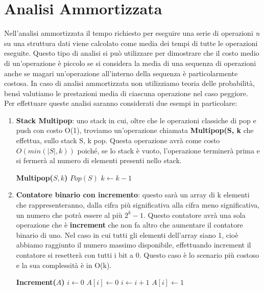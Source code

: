 \chapter{Analisi Ammortizzata}
Nell'analisi ammortizzata il tempo richiesto per eseguire una serie di operazioni \textit{n} su una struttura dati viene calcolato come media dei tempi di tutte le operazioni eseguite. Questo tipo di analisi si può utilizzare per dimostrare che il costo medio di un'operazione è piccolo se si considera la media di una sequenza di operazioni anche se magari un'operazione all'interno della sequenza è particolarmente costosa. In caso di analisi ammortizzata non utilizziamo teoria delle probabilità, bensì valutiamo le prestazioni media di ciascuna operazione nel caso peggiore.\\
Per effettuare queste analisi saranno considerati due esempi in particolare:
\begin{enumerate}
    \item \textbf{Stack Multipop}: uno stack in cui, oltre che le operazioni classiche di pop e push con costo O(1), troviamo un'operazione chiamata \textbf{Multipop(S, k} che effettua, sullo stack S, k pop. Questa operazione avrà come costo $O(min(|S|,k))$ poiché, se lo stack è vuoto, l'operazione terminerà prima e si fermerà al numero di elementi presenti nello stack.
    \begin{algorithmic}[1]
        \Statex \textbf{Multipop($S, k$)}
            \State $Pop(S)$
            \State $k \gets k - 1$
        \EndWhile
    \end{algorithmic}
    \item \textbf{Contatore binario con incremento}: questo sarà un array di k elementi che rappresenteranno, dalla cifra più significativa alla cifra meno significativa, un numero che potrà essere al più $2^k-1$. Questo contatore avrà una sola operazione che è \textbf{increment} che non fa altro che aumentare il contatore binario di uno. Nel caso in cui tutti gli elementi dell'array siano 1, cioè abbiamo raggiunto il numero massimo disponibile, effettuando increment il contatore si resetterà con tutti i bit a 0. Questo caso è lo scenario più costoso e la sua complessità è in O(k).
    \begin{samepage}
    \begin{algorithmic}[1]
        \Statex \textbf{Increment($A$)}
        \State $i \gets 0$
            \State $A[i] \gets 0$
            \State $i \gets i + 1$
        \EndWhile
            \State $A[i] \gets 1$
        \EndIf
    \end{algorithmic}
    \end{samepage}
\end{enumerate}
